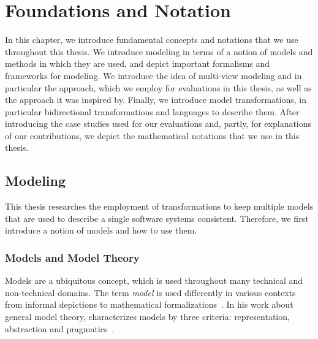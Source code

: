 \chapter{Foundations and Notation
}
\label{chap:foundations}

In this chapter, we introduce fundamental concepts and notations that we use throughout this thesis.
We introduce modeling in terms of a notion of models and methods in which they are used, and depict important formalisms and frameworks for modeling. %
We introduce the idea of multi-view modeling and in particular the \vitruv approach, which we employ for evaluations in this thesis, as well as the approach it was inspired by.
Finally, we introduce model transformations, in particular bidirectional transformations and languages to describe them. %
After introducing the case studies used for our evaluations and, partly, for explanations of our contributions, we depict the mathematical notations that we use in this thesis.


\section{Modeling}
\label{chap:foundations:modeling}

This thesis researches the employment of transformations to keep multiple models that are used to describe a single software systems consistent.
Therefore, we first introduce a notion of models and how to use them.


\subsection{Models and Model Theory}
\label{chap:foundations:modeling:models}

Models are a ubiquitous concept, which is used throughout many technical and non-technical domains.
The term \emph{model} is used differently in various contexts from informal depictions to mathematical formalizations~\cite{stachowiak1973modelltheorie-Book}.
In his work about general model theory, \citeauthor{stachowiak1973modelltheorie-Book} characterizes models by three criteria: representation, abstraction and pragmatics~\cite[p.~131--133]{stachowiak1973modelltheorie-Book}.


